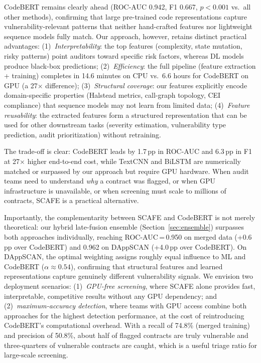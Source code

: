 \documentclass[11pt,a4paper]{article}
\newcommand{\MethodName}{SCAFE\xspace}
\begin{document}
CodeBERT remains clearly ahead (ROC-AUC 0.942, F1 0.667, $p < 0.001$ vs.\ all other methods), confirming that large pre-trained code representations capture vulnerability-relevant patterns that neither hand-crafted features nor lightweight sequence models fully match.
Our approach, however, retains distinct practical advantages:
(1)~\emph{Interpretability}: the top features (complexity, state mutation, risky patterns) point auditors toward specific risk factors, whereas DL models produce black-box predictions;
(2)~\emph{Efficiency}: the full pipeline (feature extraction + training) completes in 14.6 minutes on CPU vs.\ 6.6 hours for CodeBERT on GPU (a 27$\times$ difference);
(3)~\emph{Structural coverage}: our features explicitly encode domain-specific properties (Halstead metrics, call-graph topology, CEI compliance) that sequence models may not learn from limited data;
(4)~\emph{Feature reusability}: the extracted features form a structured representation that can be used for other downstream tasks (severity estimation, vulnerability type prediction, audit prioritization) without retraining.

The trade-off is clear: CodeBERT leads by 1.7\,pp in ROC-AUC and 6.3\,pp in F1 at 27$\times$ higher end-to-end cost, while TextCNN and BiLSTM are numerically matched or surpassed by our approach but require GPU hardware.
When audit teams need to understand \emph{why} a contract was flagged, or when GPU infrastructure is unavailable, or when screening must scale to millions of contracts, \MethodName is a practical alternative.

Importantly, the complementarity between \MethodName and CodeBERT is not merely theoretical: our hybrid late-fusion ensemble (Section~\ref{sec:ensemble}) surpasses both approaches individually, reaching ROC-AUC\,=\,0.950 on merged data (+0.6\,pp over CodeBERT) and 0.962 on DAppSCAN (+4.0\,pp over CodeBERT).
On DAppSCAN, the optimal weighting assigns roughly equal influence to ML and CodeBERT ($\alpha \approx 0.54$), confirming that structural features and learned representations capture genuinely different vulnerability signals.
We envision two deployment scenarios: (1)~\emph{GPU-free screening}, where \MethodName alone provides fast, interpretable, competitive results without any GPU dependency; and (2)~\emph{maximum-accuracy detection}, where teams with GPU access combine both approaches for the highest detection performance, at the cost of reintroducing CodeBERT's computational overhead.
With a recall of 74.8\% (merged training) and precision of 50.8\%, about half of flagged contracts are truly vulnerable and three-quarters of vulnerable contracts are caught, which is a useful triage ratio for large-scale screening.
\end{document}

